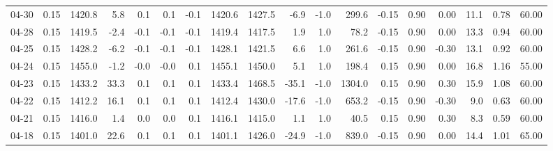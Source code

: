 \begin{threeparttable}
{\begin{tabular}{lrrrrrrrrrrrrrrrrr}
  04-30 &     0.15 & 1420.8 &               5.8 &               0.1 &                0.1 &               -0.1 & 1420.6 & 1427.5 &       -6.9 &                     -1.0 &               299.6 &      -0.15 &      0.90 &           0.00 &             11.1 &            0.78 &                  60.00 \\
  04-28 &     0.15 & 1419.5 &              -2.4 &              -0.1 &               -0.1 &               -0.1 & 1419.4 & 1417.5 &        1.9 &                      1.0 &                78.2 &      -0.15 &      0.90 &           0.00 &             13.3 &            0.94 &                  60.00 \\
  04-25 &     0.15 & 1428.2 &              -6.2 &              -0.1 &               -0.1 &               -0.1 & 1428.1 & 1421.5 &        6.6 &                      1.0 &               261.6 &      -0.15 &      0.90 &          -0.30 &             13.1 &            0.92 &                  60.00 \\
  04-24 &     0.15 & 1455.0 &              -1.2 &              -0.0 &               -0.0 &                0.1 & 1455.1 & 1450.0 &        5.1 &                      1.0 &               198.4 &       0.15 &      0.90 &           0.00 &             16.8 &            1.16 &                  55.00 \\
  04-23 &     0.15 & 1433.2 &              33.3 &               0.1 &                0.1 &                0.1 & 1433.4 & 1468.5 &      -35.1 &                     -1.0 &              1304.0 &       0.15 &      0.90 &           0.30 &             15.9 &            1.08 &                  60.00 \\
  04-22 &     0.15 & 1412.2 &              16.1 &               0.1 &                0.1 &                0.1 & 1412.4 & 1430.0 &      -17.6 &                     -1.0 &               653.2 &      -0.15 &      0.90 &          -0.30 &              9.0 &            0.63 &                  60.00 \\
  04-21 &     0.15 & 1416.0 &               1.4 &               0.0 &                0.0 &                0.1 & 1416.1 & 1415.0 &        1.1 &                      1.0 &                40.5 &       0.15 &      0.90 &           0.30 &              8.3 &            0.59 &                  60.00 \\
  04-18 &     0.15 & 1401.0 &              22.6 &               0.1 &                0.1 &                0.1 & 1401.1 & 1426.0 &      -24.9 &                     -1.0 &               839.0 &      -0.15 &      0.90 &           0.00 &             14.4 &            1.01 &                  65.00 \\

\end{tabular}}
\end{threeparttable}
